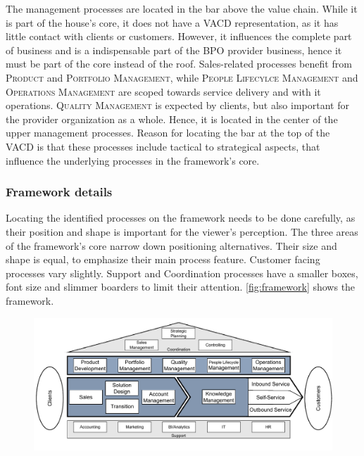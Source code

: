 	The management processes are located in the bar above the value chain. While it is part of the house's core, it does not have a \acrshort{VACD} representation, as it has little contact with clients or customers. However, it influences the complete part of business and is a indispensable part of the \acrshort{BPO} provider business, hence it must be part of the core instead of the roof. Sales-related processes benefit from \textsc{Product} and \textsc{Portfolio Management}, while \textsc{People Lifecylce Management} and \textsc{Operations Management} are scoped towards service delivery and with it operations. \textsc{Quality Management} is expected by clients, but also important for the provider organization as a whole. Hence, it is located in the center of the upper management processes. Reason for locating the bar at the top of the \acrshort{VACD} is that these processes include tactical to strategical aspects, that influence the underlying processes in the framework's core. 
	
	\subsubsection{Framework details}
	
	Locating the identified processes on the framework needs to be done carefully, as their position and shape is important for the viewer's perception. The three areas of the framework's core narrow down positioning alternatives. Their size and shape is equal, to emphasize their main process feature. Customer facing processes vary slightly. Support and Coordination processes have a smaller boxes, font size and slimmer boarders to limit their attention. \Fig \ref{fig:framework} shows the framework.
	
		\begin{figure}[caption={Framework}, label={fig:framework}]
		{	\includegraphics[width=.99\textwidth]{figures/framework_full.pdf}}
	\end{figure} 
	
